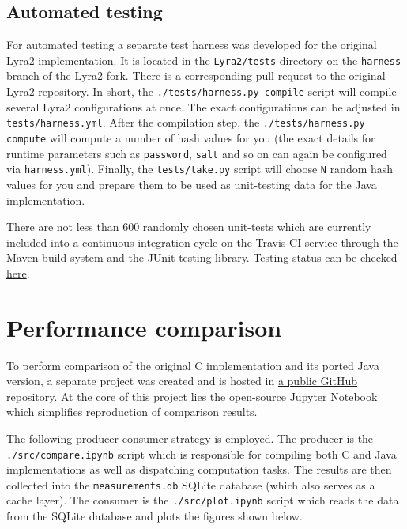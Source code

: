 \subsection{Automated testing}
\label{sec:automated-testing}

For automated testing a separate test harness was developed for the original Lyra2 implementation. It is located in the \verb|Lyra2/tests| directory on the \verb|harness| branch of the \href{https://github.com/all3fox/Lyra/tree/harness}{Lyra2 fork}. There is a \href{https://github.com/leocalm/Lyra/pull/7}{corresponding pull request} to the original Lyra2 repository. In short, the \texttt{./tests/harness.py compile} script will compile several Lyra2 configurations at once. The exact configurations can be adjusted in \verb|tests/harness.yml|. After the compilation step, the \texttt{./tests/harness.py compute} will compute a number of hash values for you (the exact details for runtime parameters such as \verb|password|, \verb|salt| and so on can again be configured via \verb|harness.yml|). Finally, the \verb|tests/take.py| script will choose \verb|N| random hash values for you and prepare them to be used as unit-testing data for the Java implementation.

There are not less than 600 randomly chosen unit-tests which are currently included into a continuous integration cycle on the Travis CI service through the Maven build system and the JUnit testing library. Testing status can be \href{https://travis-ci.org/all3fox/lyra2-java}{checked here}.

\section{Performance comparison}

To perform comparison of the original C implementation and its ported Java version, a separate project was created and is hosted in \href{https://github.com/all3fox/lyra2-compare}{a public GitHub repository}. At the core of this project lies the open-source \href{https://jupyter.org/}{Jupyter Notebook} which simplifies reproduction of comparison results.

The following producer-consumer strategy is employed. The producer is the \texttt{./src/compare.ipynb} script which is responsible for compiling both C and Java implementations as well as dispatching computation tasks. The results are then collected into the \texttt{measurements.db} SQLite database (which also serves as a cache layer). The consumer is the \texttt{./src/plot.ipynb} script which reads the data from the SQLite database and plots the figures shown below.


